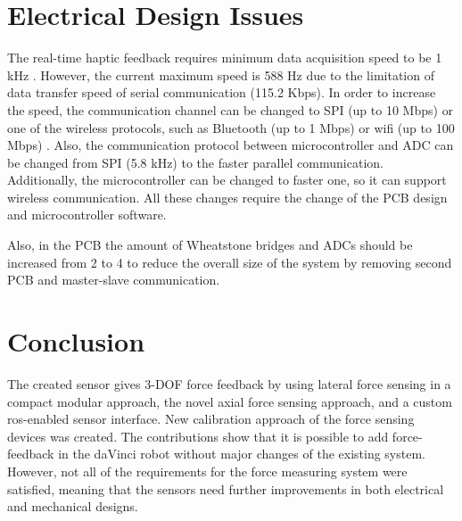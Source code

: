 \section{Electrical Design Issues}
	The real-time haptic feedback requires minimum data acquisition speed to be 1 kHz \cite{seungmoon_choi_effect_2004}. However, the current maximum speed is 588 Hz due to the limitation of data transfer speed of serial communication (115.2 Kbps). In order to increase the speed, the communication channel can be changed to SPI (up to 10 Mbps) \cite{_uart_porotocol} or one of the wireless protocols, such as Bluetooth (up to 1 Mbps) or wifi (up to 100 Mbps) \cite{_wireless_protocols}. Also, the communication protocol between microcontroller and ADC can be changed from SPI (5.8 kHz) to the faster parallel communication. Additionally, the microcontroller can be changed to faster one, so it can support wireless communication. All these changes require the change of the PCB design and microcontroller software. 
    
    Also, in the PCB the amount of Wheatstone bridges and ADCs should be increased from 2 to 4 to reduce the overall size of the system by removing second PCB and master-slave communication.
	
\section{Conclusion}

The created sensor gives 3-DOF force feedback by using lateral force sensing in a compact modular approach, the novel axial force sensing approach, and a custom ros-enabled sensor interface. New calibration approach of the force sensing devices was created. The contributions show that it is possible to add force-feedback in the daVinci robot without major changes of the existing system. However, not all of the requirements for the force measuring system were satisfied, meaning that the sensors need further improvements in both electrical and mechanical designs.